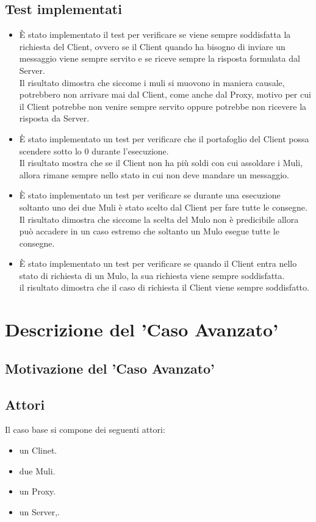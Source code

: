\documentclass[13pt,a4paper]{article}
\begin{document}
\subsection{Test implementati}
\begin{itemize}
	\item È stato implementato il test per verificare se viene sempre soddisfatta la richiesta del Client, ovvero se il Client quando ha bisogno di inviare un messaggio viene sempre servito e se riceve sempre la risposta formulata dal Server.\\
	Il risultato dimostra che siccome i muli si muovono in maniera causale, potrebbero non arrivare mai dal Client, come anche dal Proxy, motivo per cui il Client potrebbe non venire sempre servito oppure potrebbe non ricevere la risposta da Server.
	\item È stato implementato un test per verificare che il portafoglio del Client possa scendere sotto lo 0 durante l'esecuzione.\\
	Il risultato mostra che se il Client non ha più soldi con cui assoldare i Muli, allora rimane sempre nello stato in cui non deve mandare un messaggio.
	\item È stato implementato un test per verificare se durante una esecuzione soltanto uno dei due Muli è stato scelto dal Client per fare tutte le consegne.\\
	Il risultato dimostra che siccome la scelta del Mulo non è predicibile allora può accadere in un caso estremo che soltanto un Mulo esegue tutte le consegne.
	\item È stato implementato un test per verificare se quando il Client entra nello stato di richiesta di un Mulo, la sua richiesta viene sempre soddisfatta.\\
	il risultato dimostra che il caso di richiesta il Client viene sempre soddisfatto.
	
\end{itemize}

\section{Descrizione del 'Caso Avanzato'}
\subsection{Motivazione del 'Caso  Avanzato'} 

\subsection{Attori}
Il caso base si compone dei seguenti attori: 
\begin{itemize}
	\item un Clinet.
	\item due Muli.
	\item un Proxy.
	\item un Server,.
\end{itemize}
\end{document}
